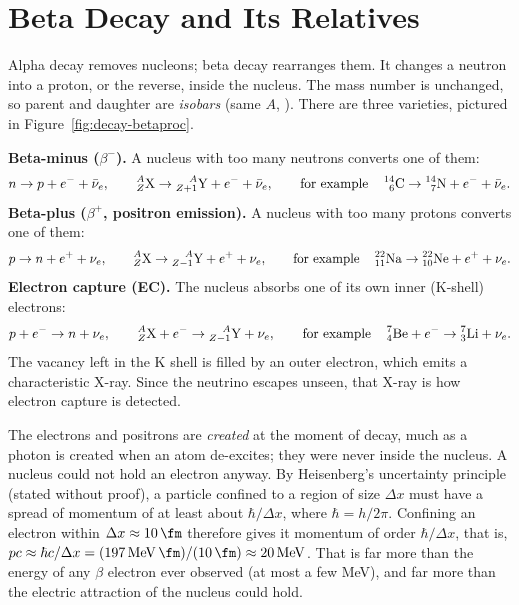 \section{Beta Decay and Its Relatives}\label{sec:decay-beta}

Alpha decay removes nucleons; beta decay rearranges them. It changes a neutron into a proton, or the
reverse, inside the nucleus. The mass number is unchanged, so parent and daughter are \emph{isobars}
(same $A$, ). There are three varieties, pictured in Figure~\ref{fig:decay-betaproc}.

\textbf{Beta-minus ($\beta^-$).} A nucleus with too many neutrons converts one of them:
\[
n\to p+e^-+\bar\nu_e,\qquad \prescript{A}{Z}{\mathrm{X}}\to\prescript{A}{Z+1}{\mathrm{Y}}+e^-+\bar\nu_e,\qquad\text{for example}\quad
\prescript{14}{6}{\mathrm{C}}\to\prescript{14}{7}{\mathrm{N}}+e^-+\bar\nu_e .
\]
\textbf{Beta-plus ($\beta^+$, positron emission).} A nucleus with too many protons converts one of them:
\[
p\to n+e^++\nu_e,\qquad \prescript{A}{Z}{\mathrm{X}}\to\prescript{A}{Z-1}{\mathrm{Y}}+e^++\nu_e,\qquad\text{for example}\quad
\prescript{22}{11}{\mathrm{Na}}\to\prescript{22}{10}{\mathrm{Ne}}+e^++\nu_e .
\]
\textbf{Electron capture (EC).} The nucleus absorbs one of its own inner (K-shell) electrons:
\[
p+e^-\to n+\nu_e,\qquad \prescript{A}{Z}{\mathrm{X}}+e^-\to\prescript{A}{Z-1}{\mathrm{Y}}+\nu_e,\qquad\text{for example}\quad
\prescript{7}{4}{\mathrm{Be}}+e^-\to\prescript{7}{3}{\mathrm{Li}}+\nu_e .
\]
The vacancy left in the K shell is filled by an outer electron, which emits a characteristic X-ray. Since
the neutrino escapes unseen, that X-ray is how electron capture is detected.

\begin{figure}[htbp]
\centering
{}
\end{figure}

The electrons and positrons are \emph{created} at the moment of decay, much as a photon is created when an
atom de-excites; they were never inside the nucleus. A nucleus could not hold an electron anyway. By
Heisenberg's uncertainty principle (stated without proof), a particle confined to a region of size
$\Delta x$ must have a spread of momentum of at least about $\hbar/\Delta x$, where $\hbar=h/2\pi$.
Confining an electron within $\Delta x\approx\SI{10}{\fm}$ therefore gives it momentum of order
$\hbar/\Delta x$, that is, $pc\approx\hbar c/\Delta x=(\SI{197}{\MeV.\fm})/(\SI{10}{\fm})\approx\SI{20}{\MeV}$.
That is far more than the energy of any $\beta$ electron ever observed (at most a few MeV), and far more
than the electric attraction of the nucleus could hold.

